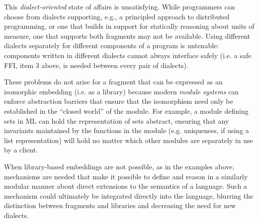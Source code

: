 \documentclass[10pt,preprint]{sigplanconf}
\begin{document}
This \emph{dialect-oriented} state of affairs is unsatisfying. %
While programmers can choose from dialects supporting, e.g., a principled approach to distributed programming, or one that builds in support for statically reasoning about units of measure, one that supports both fragments may not be available. Using different dialects separately for different components of a program is untenable: components written in different dialects cannot always interface safely (i.e. a safe FFI, item 3 above, is needed between every pair of dialects). 

These problems do not arise for a fragment that can be expressed as an isomorphic embedding (i.e. as a library) because modern \emph{module systems} can enforce abstraction barriers that ensure that the isomorphism need only be established in the ``closed world'' of the module. For example, a module defining sets in ML can hold the representation of sets abstract, ensuring that any invariants maintained by the functions in the module (e.g. uniqueness, if using a list representation) will hold no matter which other modules are separately in use by a client. %

When library-based embeddings are not possible, as in the examples above, mechanisms are needed that make it possible to define and  reason in a similarly modular manner about  direct extensions to the semantics of a language. Such a mechanism could ultimately be integrated directly into the language, blurring the distinction between fragments and libraries and decreasing the need for new dialects.%
\end{document}
